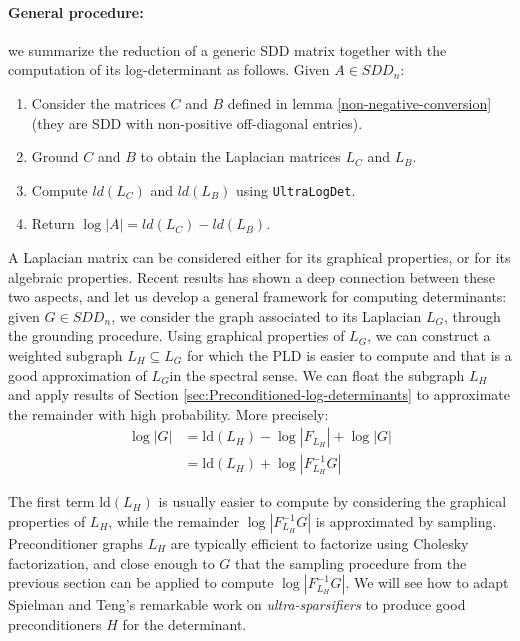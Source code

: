 \paragraph{General procedure:} we summarize the reduction of a generic SDD matrix together with the computation of its log-determinant as follows. Given $A \in SDD_n$:
\begin{enumerate}
\item Consider the matrices $C$ and $B$ defined in lemma \ref{non-negative-conversion} (they are SDD with non-positive off-diagonal entries). 
\item Ground $C$ and $B$ to obtain the Laplacian matrices $L_C$ and $L_B$.
\item Compute $ld(L_C)$ and $ld(L_B)$ using \texttt{UltraLogDet}.
\item Return $\log |A| = ld(L_C) - ld(L_B)$.   
\end{enumerate}  


A Laplacian matrix can be considered either for its graphical properties,
or for its algebraic properties. Recent results has shown a deep connection
between these two aspects, and let us develop a general framework
for computing determinants: given $G\in SDD_{n}$, we consider the
graph associated to its Laplacian $L_{G}$, through the grounding
procedure. Using graphical properties of $L_{G}$, we can construct
a weighted subgraph $L_{H}\subseteq L_{G}$ for which the PLD is easier
to compute and that is a good approximation of $L_{G}$in the spectral
sense. We can float the subgraph $L_{H}$ and apply results of Section
\ref{sec:Preconditioned-log-determinants} to approximate the remainder
with high probability. More precisely: 
\begin{align*}
\log\left|G\right| & =\text{ld}\left(L_{H}\right)-\log\left|F_{L_{H}}\right|+\log\left|G\right|\\
 & =\text{ld}\left(L_{H}\right)+\log\left|F_{L_{H}}^{-1}G\right|
\end{align*}


The first term $\text{ld}\left(L_{H}\right)$ is usually easier to
compute by considering the graphical properties of $L_{H}$, while
the remainder $\log\left|F_{L_{H}}^{-1}G\right|$ is approximated
by sampling. Preconditioner graphs $L_{H}$ are typically efficient
to factorize using Cholesky factorization, and close enough to $G$
that the sampling procedure from the previous section can be applied
to compute $\log\left|F_{L_{H}}^{-1}G\right|$. We will see how to
adapt Spielman and Teng's remarkable work on \emph{ultra-sparsifiers}
to produce good preconditioners $H$ for the determinant. 


